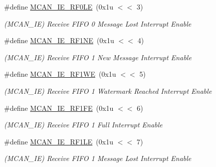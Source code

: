 \begin{DoxyCompactItemize}
\mbox{\label{group__SAME70__MCAN_gabe4fd4dd72f05d7a0563d23de4466bf4}} 
\#define \mbox{\hyperlink{group__SAME70__MCAN_gabe4fd4dd72f05d7a0563d23de4466bf4}{M\+C\+A\+N\+\_\+\+I\+E\+\_\+\+R\+F0\+LE}}~(0x1u $<$$<$ 3)
\begin{DoxyCompactList}\small\item\em (M\+C\+A\+N\+\_\+\+IE) Receive F\+I\+FO 0 Message Lost Interrupt Enable \end{DoxyCompactList}\item 
\mbox{\label{group__SAME70__MCAN_ga128e1078ae44d43fee9f447f2b99f869}} 
\#define \mbox{\hyperlink{group__SAME70__MCAN_ga128e1078ae44d43fee9f447f2b99f869}{M\+C\+A\+N\+\_\+\+I\+E\+\_\+\+R\+F1\+NE}}~(0x1u $<$$<$ 4)
\begin{DoxyCompactList}\small\item\em (M\+C\+A\+N\+\_\+\+IE) Receive F\+I\+FO 1 New Message Interrupt Enable \end{DoxyCompactList}\item 
\mbox{\label{group__SAME70__MCAN_ga2a330b1fc902eb510196a046ee59b293}} 
\#define \mbox{\hyperlink{group__SAME70__MCAN_ga2a330b1fc902eb510196a046ee59b293}{M\+C\+A\+N\+\_\+\+I\+E\+\_\+\+R\+F1\+WE}}~(0x1u $<$$<$ 5)
\begin{DoxyCompactList}\small\item\em (M\+C\+A\+N\+\_\+\+IE) Receive F\+I\+FO 1 Watermark Reached Interrupt Enable \end{DoxyCompactList}\item 
\mbox{\label{group__SAME70__MCAN_ga2ffb9516c3b68ac751bef7e91cbcf2f1}} 
\#define \mbox{\hyperlink{group__SAME70__MCAN_ga2ffb9516c3b68ac751bef7e91cbcf2f1}{M\+C\+A\+N\+\_\+\+I\+E\+\_\+\+R\+F1\+FE}}~(0x1u $<$$<$ 6)
\begin{DoxyCompactList}\small\item\em (M\+C\+A\+N\+\_\+\+IE) Receive F\+I\+FO 1 Full Interrupt Enable \end{DoxyCompactList}\item 
\mbox{\label{group__SAME70__MCAN_ga9677fc196338e0916ef21d3f850d893b}} 
\#define \mbox{\hyperlink{group__SAME70__MCAN_ga9677fc196338e0916ef21d3f850d893b}{M\+C\+A\+N\+\_\+\+I\+E\+\_\+\+R\+F1\+LE}}~(0x1u $<$$<$ 7)
\begin{DoxyCompactList}\small\item\em (M\+C\+A\+N\+\_\+\+IE) Receive F\+I\+FO 1 Message Lost Interrupt Enable \end{DoxyCompactList}\item 
$$
\end{DoxyCompactItemize}

